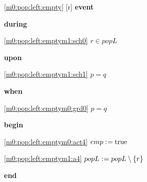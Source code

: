 \noindent \ref{m0:pop:left:empty} [r] \textbf{event}
\begin{block}
  \item   \textbf{during}
  \begin{block}
  \item[ \eqref{m0:pop:left:emptym1:sch0} ]$r \in popL $ %
  \end{block}
  \item   \textbf{upon}
  \begin{block}
  \item[ \eqref{m0:pop:left:emptym1:sch1} ]$p = q $ %
  \end{block}
  \item   \textbf{when}
  \begin{block}
  \item[ \eqref{m0:pop:left:emptym0:grd0} ]$p = q $ %
  \end{block}
  \item   \textbf{begin}
  \begin{block}
  \item[ \eqref{m0:pop:left:emptym0:act4} ]$emp \mathrel{:\mkern1mu=} \text{true} $ %
  \item[ \eqref{m0:pop:left:emptym1:a4} ]$popL \mathrel{:\mkern1mu=} popL \setminus \{ r \} $ %
  \end{block}
  \item   \textbf{end} \\
\end{block}
